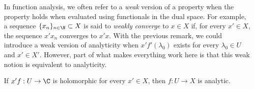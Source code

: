 In function analysis, we often refer to a \textit{weak} version of a property when the property holds when evaluated using functionals in the dual space. For example, a sequence $\{x_n\}_{n\in \N} \subset X$ is said to \textit{weakly converge} to $x\in X$ if, for every $x'\in X$, the sequence $x'x_n$ converges to $x'x$. With the previous remark, we could introduce a weak version of analyticity when $x'f'(\lambda_0)$ exists for every $\lambda_0 \in U$ and $x' \in X'$. However, part of what makes everything work here is that this weak notion is equivalent to analyticity.

\begin{theorem}\label{thm:weakly_analytic_implies_analytic}
    If $x'f: U\to \C$ is holomorphic for every $x'\in X$, then $f: U \to X$ is analytic.
\end{theorem}

